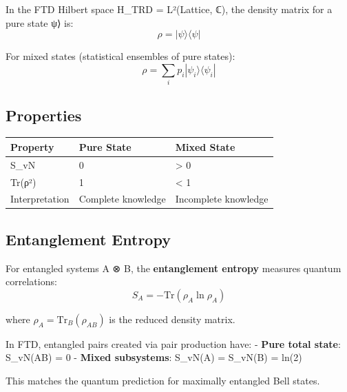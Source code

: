 \documentclass[
  11pt,
  letterpaper,
  twoside,
  openright]{book}
\begin{document}
In the FTD Hilbert space H\_TRD = L²(Lattice, ℂ), the density matrix for
a pure state \textbar ψ⟩ is: \[
\rho = |\psi\rangle\langle\psi|
\]

For mixed states (statistical ensembles of pure states): \[
\rho = \sum_i p_i |\psi_i\rangle\langle\psi_i|
\]

\subsection{Properties}\label{properties-22}

\begin{longtable}[]{@{}lll@{}}
\toprule\noalign{}
Property & Pure State & Mixed State \\
\midrule\noalign{}
\endhead
\bottomrule\noalign{}
\endlastfoot
S\_vN & 0 & \textgreater{} 0 \\
Tr(ρ²) & 1 & \textless{} 1 \\
Interpretation & Complete knowledge & Incomplete knowledge \\
\end{longtable}

\subsection{Entanglement Entropy}\label{entanglement-entropy}

For entangled systems A ⊗ B, the \textbf{entanglement entropy} measures
quantum correlations: \[
S_A = -\text{Tr}(\rho_A \ln \rho_A)
\]

where \(\rho_A = \text{Tr}_B(\rho_{AB})\) is the reduced density matrix.

\begin{tcolorbox}[enhanced jigsaw, leftrule=.75mm, title=\textcolor{quarto-callout-note-color}{\faInfo}\hspace{0.5em}{FTD Connection}, bottomrule=.15mm, opacityback=0, coltitle=black, arc=.35mm, colframe=quarto-callout-note-color-frame, colbacktitle=quarto-callout-note-color!10!white, colback=white, titlerule=0mm, breakable, bottomtitle=1mm, toptitle=1mm, rightrule=.15mm, toprule=.15mm, left=2mm, opacitybacktitle=0.6]

In FTD, entangled pairs created via pair production have: - \textbf{Pure
total state}: S\_vN(AB) = 0 - \textbf{Mixed subsystems}: S\_vN(A) =
S\_vN(B) = ln(2)

This matches the quantum prediction for maximally entangled Bell states.

\end{tcolorbox}
\end{document}
